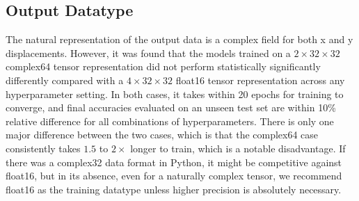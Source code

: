 \documentclass[preprint,review,12pt]{elsarticle}
\begin{document}

\subsection{Output Datatype}
\label{ssec:output_datatype}
The natural representation of the output data is a complex field for both x and y displacements. However, it was found that the models trained on a $2\times 32 \times 32$ complex64 tensor representation did not perform statistically significantly differently compared with a $4\times 32 \times 32$ float16 tensor representation across any hyperparameter setting. In both cases, it takes within 20 epochs for training to converge, and final accuracies evaluated on an unseen test set are within 10\% relative difference for all combinations of hyperparameters. There is only one major difference between the two cases, which is that the complex64 case consistently takes $1.5$ to $2 \times$ longer to train, which is a notable disadvantage. If there was a complex32 data format in Python, it might be competitive against float16, but in its absence, even for a naturally complex tensor, we recommend float16 as the training datatype unless higher precision is absolutely necessary. 
\end{document}
